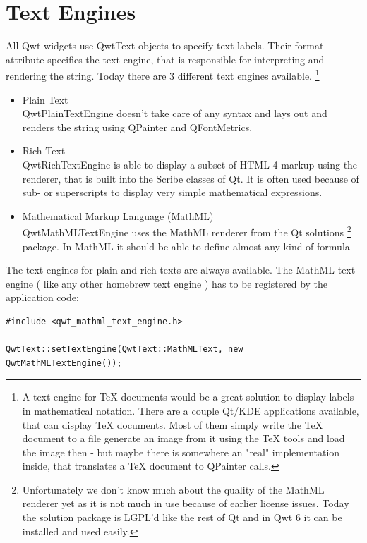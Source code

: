 \documentclass[12pt,a4paper]{book}
\begin{document}
\chapter{Text Engines}

All Qwt widgets use QwtText objects to specify text labels. 
Their format attribute specifies the text engine, that is 
responsible for interpreting and rendering the string. 
Today there are 3 different text engines available.
\footnote{A text engine for TeX documents would be a great 
solution to display labels in mathematical notation. 
There are a couple Qt/KDE applications available, 
that can display TeX documents. Most of them simply write 
the TeX document to a file generate an image from it using the 
TeX tools and load the image then - but maybe there is 
somewhere an "real" implementation inside, that 
translates a TeX document to QPainter calls. }

\begin{itemize}

\item Plain Text\\
QwtPlainTextEngine doesn't take care of any syntax and lays out and renders 
the string using QPainter and QFontMetrics.

\item Rich Text\\
QwtRichTextEngine is able to display a subset of HTML 4 markup using the renderer,
that is built into the Scribe classes of Qt. It is often used because of
sub- or superscripts to display very simple mathematical expressions.

\item Mathematical Markup Language (MathML)\\
QwtMathMLTextEngine uses the MathML renderer from the Qt solutions
\footnote{
Unfortunately we don't know much about the quality of the MathML renderer yet
as it is not much in use because of earlier license issues. 
Today the solution package is LGPL'd like the rest of Qt and in Qwt 6 it can be
installed and used easily.
}
package. In MathML it should be able to define almost any kind of formula

\end{itemize}

The text engines for plain and rich texts are always available. 
The MathML text engine ( like any other homebrew text engine ) has to be
registered by the application code:

\bigskip 
\begin{lstlisting}
#include <qwt_mathml_text_engine.h>

QwtText::setTextEngine(QwtText::MathMLText, new QwtMathMLTextEngine());
\end{lstlisting}
\bigskip 
\end{document}
